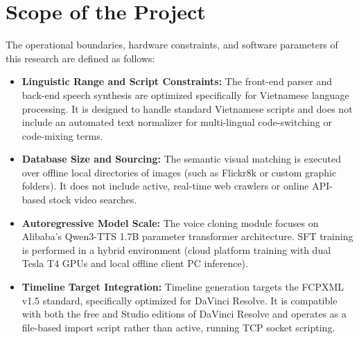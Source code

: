 \documentclass[a4paper,12pt]{report}
\begin{document}
\section{Scope of the Project}
The operational boundaries, hardware constraints, and software parameters of this research are defined as follows:
\begin{itemize}
    \item \textbf{Linguistic Range and Script Constraints:} The front-end parser and back-end speech synthesis are optimized specifically for Vietnamese language processing. It is designed to handle standard Vietnamese scripts and does not include an automated text normalizer for multi-lingual code-switching or code-mixing terms.
    \item \textbf{Database Size and Sourcing:} The semantic visual matching is executed over offline local directories of images (such as Flickr8k or custom graphic folders). It does not include active, real-time web crawlers or online API-based stock video searches.
    \item \textbf{Autoregressive Model Scale:} The voice cloning module focuses on Alibaba's Qwen3-TTS 1.7B parameter transformer architecture. SFT training is performed in a hybrid environment (cloud platform training with dual Tesla T4 GPUs and local offline client PC inference).
    \item \textbf{Timeline Target Integration:} Timeline generation targets the FCPXML v1.5 standard, specifically optimized for DaVinci Resolve. It is compatible with both the free and Studio editions of DaVinci Resolve and operates as a file-based import script rather than active, running TCP socket scripting.
\end{itemize}
\end{document}
